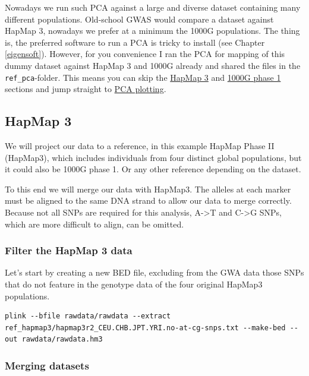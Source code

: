 \documentclass[
]{book}
\begin{document}
Nowadays we run such PCA against a large and diverse dataset containing many different populations. Old-school GWAS would compare a dataset against HapMap 3, nowadays we prefer at a minimum the 1000G populations. The thing is, the preferred software to run a PCA is tricky to install (see Chapter \ref{eigensoft}).
However, for you convenience I ran the PCA for mapping of this dummy dataset against HapMap 3 and 1000G already and shared the files in the \texttt{ref\_pca}-folder. This means you can skip the \protect\hyperlink{hapmap-3}{HapMap 3} and \protect\hyperlink{g-phase-1}{1000G phase 1} sections and jump straight to \protect\hyperlink{pca-plotting}{PCA plotting}.

\hypertarget{hapmap-3}{%
\subsection{HapMap 3}\label{hapmap-3}}

We will project our data to a reference, in this example HapMap Phase II (HapMap3), which includes individuals from four distinct global populations, but it could also be 1000G phase 1. Or any other reference depending on the dataset.

To this end we will merge our data with HapMap3. The alleles at each marker must be aligned to the same DNA strand to allow our data to merge correctly. Because not all SNPs are required for this analysis, A-\textgreater T and C-\textgreater G SNPs, which are more difficult to align, can be omitted.

\hypertarget{filter-the-hapmap-3-data}{%
\subsubsection{Filter the HapMap 3 data}\label{filter-the-hapmap-3-data}}

Let's start by creating a new BED file, excluding from the GWA data those SNPs that do not feature in the genotype data of the four original HapMap3 populations.

\begin{verbatim}
plink --bfile rawdata/rawdata --extract ref_hapmap3/hapmap3r2_CEU.CHB.JPT.YRI.no-at-cg-snps.txt --make-bed --out rawdata/rawdata.hm3
\end{verbatim}

\hypertarget{merging-datasets}{%
\subsubsection{Merging datasets}\label{merging-datasets}}
\end{document}
